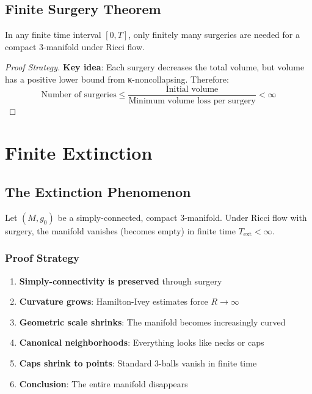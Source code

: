 \section{Finite Surgery Theorem}

\begin{theorem}
\label{thm:finite_surgery}
In any finite time interval $[0, T]$, only finitely many surgeries are needed for a compact 3-manifold under Ricci flow.
\end{theorem}

\begin{proof}[Proof Strategy]
\textbf{Key idea}: Each surgery decreases the total volume, but volume has a positive lower bound from κ-noncollapsing. Therefore:
\[
\text{Number of surgeries} \leq \frac{\text{Initial volume}}{\text{Minimum volume loss per surgery}} < \infty
\]
\end{proof}

\chapter{Finite Extinction}
\label{chap:extinction}

\section{The Extinction Phenomenon}

\begin{theorem}
\label{thm:finite_extinction}
Let $(M, g_0)$ be a simply-connected, compact 3-manifold. Under Ricci flow with surgery, the manifold vanishes (becomes empty) in finite time $T_{\text{ext}} < \infty$.
\end{theorem}

\subsection{Proof Strategy}

\begin{enumerate}
\item \textbf{Simply-connectivity is preserved} through surgery
\item \textbf{Curvature grows}: Hamilton-Ivey estimates force $R \to \infty$
\item \textbf{Geometric scale shrinks}: The manifold becomes increasingly curved
\item \textbf{Canonical neighborhoods}: Everything looks like necks or caps
\item \textbf{Caps shrink to points}: Standard 3-balls vanish in finite time
\item \textbf{Conclusion}: The entire manifold disappears
\end{enumerate}

